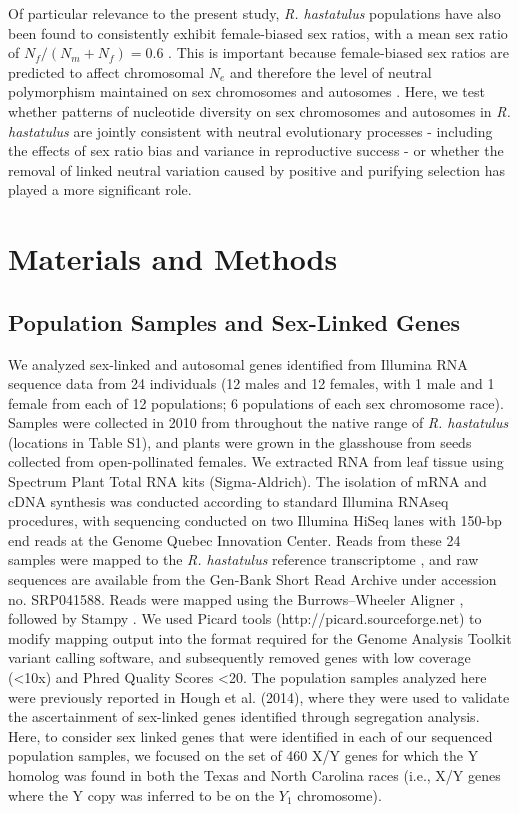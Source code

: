 \documentclass[9pt,twocolumn,twoside]{gsajnl}
\begin{document}
Of particular relevance to the present study, \textit{R. hastatulus} populations have also been found to consistently exhibit female-biased sex ratios, with a mean sex ratio of $N_{f}/(N_{m}+N_{f})=0.6$ \citep{pickup2013influence}. This is important because female-biased sex ratios are predicted to affect chromosomal $N_{e}$ and therefore the level of neutral polymorphism maintained on sex chromosomes and autosomes \citep{ellegren2009}. Here, we test whether patterns of nucleotide diversity on sex chromosomes and autosomes in \textit{R. hastatulus} are jointly consistent with neutral evolutionary processes - including the effects of sex ratio bias and variance in reproductive success - or whether the removal of linked neutral variation caused by positive and purifying selection has played a more significant role.

\section*{Materials and Methods}
\subsection*{Population Samples and Sex-Linked Genes}
We analyzed sex-linked and autosomal genes identified from Illumina RNA sequence data from 24 individuals (12 males and 12 females, with 1 male and 1 female from each of 12 populations; 6 populations of each sex chromosome race). Samples were collected in 2010 from throughout the native range of \textit{R. hastatulus} (locations in Table S1), and plants were grown in the glasshouse from seeds collected from open-pollinated females. We extracted RNA from leaf tissue using Spectrum Plant Total RNA kits (Sigma-Aldrich). The isolation of mRNA and cDNA synthesis was conducted according to standard Illumina RNAseq procedures, with sequencing conducted on two Illumina HiSeq lanes with 150-bp end reads at the Genome Quebec Innovation Center. Reads from these 24 samples were mapped to the \textit{R. hastatulus} reference transcriptome \citep{hough2014}, and raw sequences are available from the Gen-Bank Short Read Archive under accession no. SRP041588. Reads were mapped using the Burrows–Wheeler Aligner \citep{li2010fast}, followed by Stampy \citep{lunter2011stampy}. We used Picard tools (http://picard.sourceforge.net) to modify mapping output into the format required for the Genome Analysis Toolkit \citep{mckenna2010genome} variant calling software, and subsequently removed genes with low coverage (<10x) and Phred Quality Scores <20. The population samples analyzed here were previously reported in Hough et al. (2014), where they were used to validate the ascertainment of sex-linked genes identified through segregation analysis. Here, to consider sex linked genes that were identified in each of our sequenced population samples, we focused on the set of 460 X/Y genes for which the Y homolog was found in both the Texas and North Carolina races (i.e., X/Y genes where the Y copy was inferred to be on the $Y_{1}$ chromosome).
\end{document}

